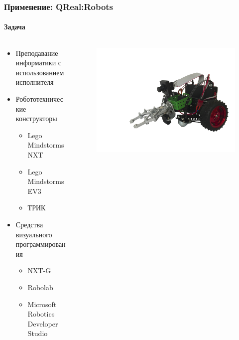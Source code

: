 \documentclass[14pt]{beamer}
\begin{document}
\begin{frame}
    \frametitle{Применение: QReal:Robots}
    \framesubtitle{Задача}
    \begin{columns}[onlytextwidth]
       \begin{column}{0.7\textwidth}
            \begin{itemize}
                \item Преподавание информатики с использованием исполнителя
                \item Робототехнические конструкторы
                \begin{itemize}
                    \item Lego Mindstorms NXT
                    \item Lego Mindstorms EV3
                    \item ТРИК
                \end{itemize}
                \item Средства визуального программирования
                \begin{itemize}
                    \item NXT-G
                    \item Robolab
                    \item Microsoft Robotics Developer Studio
                \end{itemize}
            \end{itemize}
        \end{column}
        \begin{column}{0.3\textwidth}
            \begin{figure}
            	\begin{center}
             		\includegraphics[width=\textwidth]{images/presentation/trik.png}\\

\end{center}
\end{figure}
\end{column}
\end{columns}
\end{frame}
\end{document}
